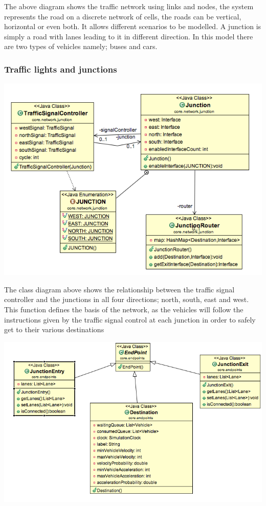 The above diagram shows the traffic network using links and nodes, the system represents the road on a discrete network of cells, the roads can be vertical, horizontal or even both. It allows different scenarios to be modelled. A junction is simply a road with lanes leading to it in different direction. In this model there are two types of vehicles namely; buses and cars.

\subsubsection{Traffic lights and junctions}
\includegraphics[scale=0.4]{./images/class4.png}


The class diagram above shows the relationship between the traffic signal controller and the junctions in all four directions; north, south, east and west. This function defines the basis of the network, as the vehicles will follow the instructions given by the traffic signal control at each junction in order to safely get to their various destinations

\includegraphics[scale=0.4]{./images/class3.png}

